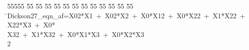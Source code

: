%
%
\begin{tabbing}
55555 \= 55 \= 55 \= 55 \= 55 \= 55 \= 55 \= 55 \= 55 \= 55 \= 55 \= 55 \= 55 \= \>Dickson27\_eqn\_af=X02*X1\ +\ X02*X2\ +\ X0*X12\ +\ X0*X22\ +\ X1*X22\ +\ X22*X3\ +\ X0*\\[0pt]
\>X32\ +\ X1*X32\ +\ X0*X1*X3\ +\ X0*X2*X3\\[0pt]
2\>\end{tabbing}
